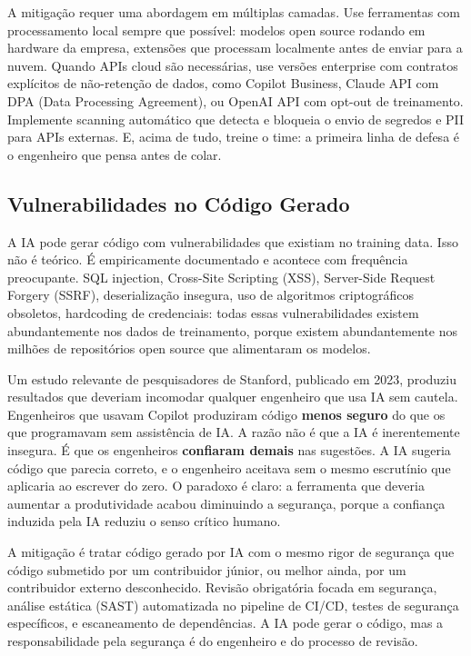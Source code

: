 A mitigação requer uma abordagem em múltiplas camadas. Use ferramentas com
processamento local sempre que possível: modelos open source rodando em hardware
da empresa, extensões que processam localmente antes de enviar para a nuvem. Quando
APIs cloud são necessárias, use versões enterprise com contratos explícitos de
não-retenção de dados, como Copilot Business, Claude API com DPA (Data Processing
Agreement), ou OpenAI API com opt-out de treinamento. Implemente scanning automático
que detecta e bloqueia o envio de segredos e PII para APIs externas. E, acima de tudo,
treine o time: a primeira linha de defesa é o engenheiro que pensa antes de colar.

\subsection{Vulnerabilidades no Código Gerado}

A IA pode gerar código com vulnerabilidades que existiam no training data. Isso não
é teórico. É empiricamente documentado e acontece com frequência preocupante. SQL
injection, Cross-Site Scripting (XSS), Server-Side Request Forgery (SSRF),
deserialização insegura, uso de algoritmos criptográficos obsoletos, hardcoding de
credenciais: todas essas vulnerabilidades existem abundantemente nos dados de
treinamento, porque existem abundantemente nos milhões de repositórios open source
que alimentaram os modelos.

Um estudo relevante de pesquisadores de Stanford, publicado em 2023, produziu
resultados que deveriam incomodar qualquer engenheiro que usa IA sem cautela.
Engenheiros que usavam Copilot produziram código \textbf{menos seguro} do que os
que programavam sem assistência de IA. A razão não é que a IA é inerentemente
insegura. É que os engenheiros \textbf{confiaram demais} nas sugestões. A IA
sugeria código que parecia correto, e o engenheiro aceitava sem o mesmo escrutínio
que aplicaria ao escrever do zero. O paradoxo é claro: a ferramenta que deveria
aumentar a produtividade acabou diminuindo a segurança, porque a confiança
induzida pela IA reduziu o senso crítico humano.

A mitigação é tratar código gerado por IA com o mesmo rigor de segurança que código
submetido por um contribuidor júnior, ou melhor ainda, por um contribuidor
externo desconhecido. Revisão obrigatória focada em segurança, análise estática
(SAST) automatizada no pipeline de CI/CD, testes de segurança específicos, e
escaneamento de dependências. A IA pode gerar o código, mas a responsabilidade pela
segurança é do engenheiro e do processo de revisão.


